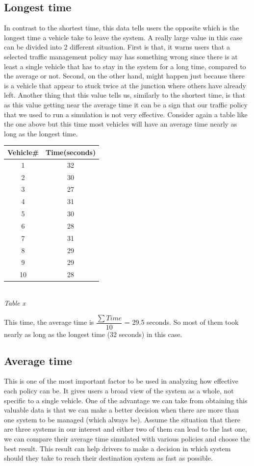 \documentclass[11pt]{article}
\begin{document}
\subsection{Longest time}
	In contrast to the shortest time, this data tells users the opposite which is the longest time a vehicle take to leave the system. A really large value in this case can be divided into 2 different situation. First is that, it warns users that a selected traffic management policy may has something wrong since there is at least a single vehicle that has to stay in the system for a long time, compared to the average or not. Second, on the other hand, might happen just because there is a vehicle that appear to stuck twice at the junction where others have already left. Another thing that this value tells us, similarly to the shortest time, is that as this value getting near the average time it can be a sign that our traffic policy that we used to run a simulation is not very effective. Consider again a table like the one above but this time most vehicles will have an average time nearly as long as the longest time.
\\
\begin{center}
	\begin{tabular}{c c}
		\hline
		Vehicle\# & Time(seconds)\\ \hline
		1 & 32 \\
		2 & 30 \\
		3 & 27 \\
		4 & 31 \\
		5 & 30 \\
		6 & 28 \\
		7 & 31 \\
		8 & 29 \\
		9 & 29 \\
		10 & 28 \\ \hline
	\end{tabular}
	\\[0.1 cm]
	\textit{Table x}
\end{center}
This time, the average time is $ \dfrac{\sum{Time}}{10} $ = 29.5 seconds. So most of them took nearly as long as the longest time (32 seconds) in this case.
\subsection{Average time}
	 This is one of the most important factor to be used in analyzing how effective each policy can be. It gives users a broad view of the system as a whole, not specific to a single vehicle. One of the advantage we can take from obtaining this valuable data is that we can make a better decision when there are more than one system to be managed (which always be). Assume the situation that there are three systems in our interest and either two of them can lead to the last one, we can compare their average time simulated with various policies and choose the best result. This result can help drivers to make a decision in which system should they take to reach their destination system as fast as possible.
	 
\end{document}
